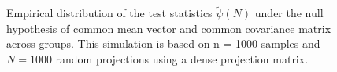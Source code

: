 \documentclass[times,sort&compress,3p]{elsarticle}
\theoremstyle{plain}%
\theoremstyle{definition}
\begin{document}
\begin{figure}[H]
  \centering
{}
\caption{Empirical distribution of the test statistics $\widetilde{\psi}(N)$ under the null hypothesis of common mean vector and common covariance matrix across groups. This simulation is based on n = 1000 samples and $N = 1000$ random projections using a dense projection matrix.}
  \label{fig:BFh0}
\end{figure}
  
\end{document}
